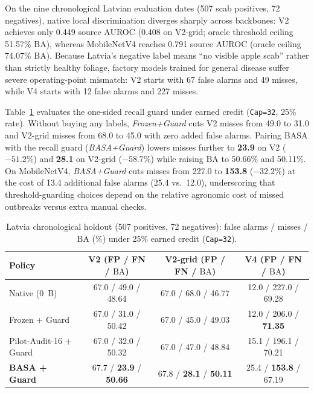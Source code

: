 \documentclass[preprint,12pt,authoryear]{elsarticle}
\newcommand{\BA}{\mathrm{BA}}
\begin{document}
On the nine chronological Latvian evaluation dates (507 scab positives, 72 negatives), native local discrimination diverges sharply across backbones: V2 achieves only 0.449 source AUROC (0.408 on V2-grid; oracle threshold ceiling 51.57\% $\BA$), whereas MobileNetV4 reaches 0.791 source AUROC (oracle ceiling 74.07\% $\BA$). Because Latvia's negative label means ``no visible apple scab'' rather than strictly healthy foliage, factory models trained for general disease suffer severe operating-point mismatch: V2 starts with 67 false alarms and 49 misses, while V4 starts with 12 false alarms and 227 misses.

Table~\ref{tab:guard} evaluates the one-sided recall guard under earned credit (\texttt{Cap=32}, 25\% rate). Without buying any labels, \emph{Frozen+Guard} cuts V2 misses from 49.0 to 31.0 and V2-grid misses from 68.0 to 45.0 with zero added false alarms. Pairing BASA with the recall guard (\emph{BASA+Guard}) lowers misses further to \textbf{23.9} on V2 ($-51.2\%$) and \textbf{28.1} on V2-grid ($-58.7\%$) while raising $\BA$ to 50.66\% and 50.11\%. On MobileNetV4, \emph{BASA+Guard} cuts misses from 227.0 to \textbf{153.8} ($-32.2\%$) at the cost of 13.4 additional false alarms (25.4 vs.\ 12.0), underscoring that threshold-guarding choices depend on the relative agronomic cost of missed outbreaks versus extra manual checks.

\begin{table}[t]
\centering
\caption{Latvia chronological holdout (507 positives, 72 negatives): false alarms / misses / $\BA$ (\%) under 25\% earned credit (\texttt{Cap=32}).}
\label{tab:guard}
\small
\begin{tabular}{@{}lccc@{}}
\toprule
Policy & V2 (FP / FN / $\BA$) & V2-grid (FP / FN / $\BA$) & V4 (FP / FN / $\BA$) \\
\midrule
Native (0~B)            & 67.0 / 49.0 / 48.64 & 67.0 / 68.0 / 46.77 & 12.0 / 227.0 / 69.28 \\
Frozen + Guard          & 67.0 / 31.0 / 50.42 & 67.0 / 45.0 / 49.03 & 12.0 / 206.0 / \textbf{71.35} \\
Pilot-Audit-16 + Guard  & 67.0 / 32.0 / 50.32 & 67.0 / 47.0 / 48.84 & 15.1 / 196.1 / 70.21 \\
\textbf{BASA + Guard}   & 67.7 / \textbf{23.9} / \textbf{50.66} & 67.8 / \textbf{28.1} / \textbf{50.11} & 25.4 / \textbf{153.8} / 67.19 \\
\bottomrule
\end{tabular}
\end{table}
\end{document}

